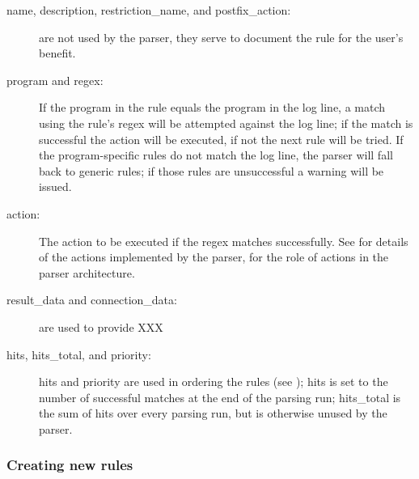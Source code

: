 \begin{description}

    \item [name, description, restriction\_name, and postfix\_action:] are
        not \newline{} used by the parser, they serve to document the rule
        for the user's benefit.

    \item [program and regex:] If the program in the rule equals the
        program in the log line, a match using the rule's regex will be
        attempted against the log line; if the match is successful the
        action will be executed, if not the next rule will be tried.  If
        the program-specific rules do not match the log line, the parser
        will fall back to generic rules; if those rules are unsuccessful a
        warning will be issued.

    \item [action:] The action to be executed if the regex matches
        successfully.  See  for details of
        the actions implemented by the parser,  for the role of actions in the parser architecture.

    \item [result\_data and connection\_data:] are used to provide XXX

    \item [hits, hits\_total, and priority:] hits and priority are used in
        ordering the rules (see );
        hits is set to the number of successful matches at the end of the
        parsing run; hits\_total is the sum of hits over every parsing run,
        but is otherwise unused by the parser.


\end{description}


\subsubsection{Creating new rules}

\label{creating new rules}

